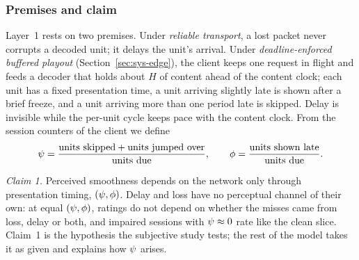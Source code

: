 \subsubsection{Premises and claim}
Layer~1 rests on two premises. Under \emph{reliable transport}, a lost
packet never corrupts a decoded unit; it delays the unit's arrival.
Under \emph{deadline-enforced buffered playout}
(Section~\ref{sec:sys-edge}), the client keeps one request in flight
and feeds a decoder that holds about $H$ of content ahead of the
content clock; each unit has a fixed presentation time, a unit arriving
slightly late is shown after a brief freeze, and a unit arriving more
than one period late is skipped. Delay is invisible while the per-unit
cycle keeps pace with the content clock. From the session counters of
the client we define
\begin{equation}
  \psi = \frac{\text{units skipped} + \text{units jumped over}}{\text{units due}},
  \qquad
  \phi = \frac{\text{units shown late}}{\text{units due}}.
  \label{eq:tlf}
\end{equation}

\emph{Claim 1.} Perceived smoothness depends on the network only
through presentation timing, $(\psi, \phi)$. Delay and loss have no
perceptual channel of their own: at equal $(\psi, \phi)$, ratings do
not depend on whether the misses came from loss, delay or both, and
impaired sessions with $\psi \approx 0$ rate like the clean slice.
Claim~1 is the hypothesis the subjective study tests; the rest of the
model takes it as given and explains how $\psi$ arises.

